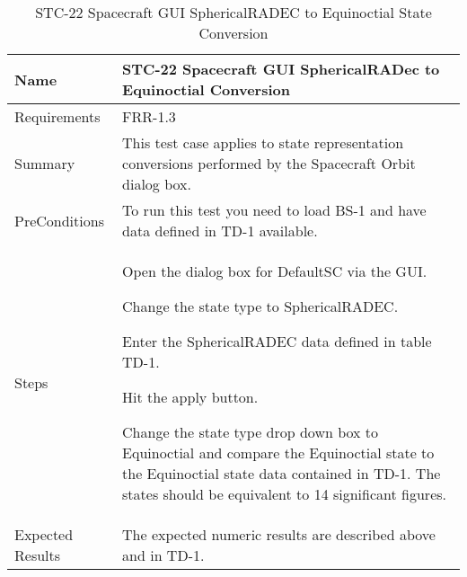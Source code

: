\begin{table}[htbp!]
\centering
      \begin{tabular}{|p{1.05 in} |p{4.75 in} |}
      \hline
         \rowcolor[rgb]{0.8,0.8,0.8} Name & STC-22 Spacecraft GUI SphericalRADec to Equinoctial Conversion\\
         \hline
         Requirements & FRR-1.3\\ \hline
         Summary &
         This test case applies to state representation conversions performed by the Spacecraft Orbit dialog box.  \\
         \hline
         PreConditions & To run this test you need to load BS-1 and have data defined in TD-1 available.\\
         \hline
         Steps &
         \begin{compactenum}
         \item Open the dialog box for DefaultSC via the GUI.
         \item Change the state type to SphericalRADEC.
         \item Enter the SphericalRADEC data defined in table TD-1.
         \item Hit the apply button.
         \item Change the state type drop down box to Equinoctial and compare the Equinoctial state to the
         Equinoctial state data contained in TD-1. The states should be equivalent to 14 significant figures.
         \end{compactenum}\\
         \hline
         Expected Results & The expected numeric results are described above and in TD-1.\\
      \hline
\end{tabular}
      \label{Table: STC-22}
      \caption{STC-22 Spacecraft GUI SphericalRADEC to Equinoctial State Conversion}
\end{table} 